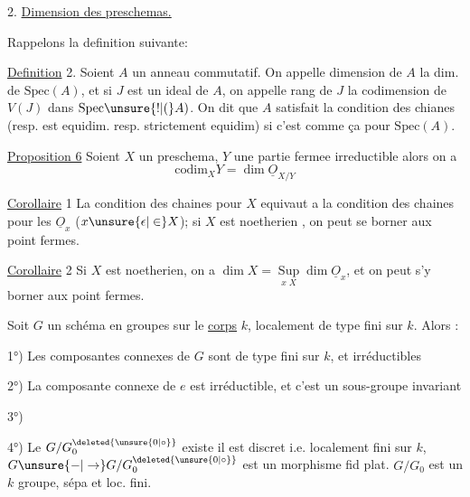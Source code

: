 2. \uline{Dimension des preschemas.}

Rappelons la definition suivante:

\uline{Definition} 2. Soient $A$ un anneau commutatif. On appelle dimension de
$A$ la dim. de $\mathrm{Spec}(A)$, et si $J$ est un ideal de $A$, on appelle rang de $J$
la codimension de $V(J)$ dans $\mathrm{Spec}\unsure{!|(}A)$. On dit que $A$  satisfait
la condition des chianes (resp. est equidim. resp. strictement equidim)
si c'est comme ça pour $\mathrm{Spec}(A)$.

\uline{Proposition 6} \quad Soient $X$ un preschema, $Y$ une partie fermee irreductible
alors on a
\[
\mathrm{codim}_X Y=\dim\underline O_{X/Y}
\]

\uline{Corollaire} 1 \quad La condition des chaines pour $X$ equivaut a la condition
des chaines pour les $\underline O_x$ ($x\unsure{\epsilon|\in}X$); si $X$ est noetherien , on peut se
borner aux point fermes.

\uline{Corollaire} 2 \quad Si $X$ est noetherien, on a $\dim X=\mathop{\mathrm{Sup}}\limits_{x\;X}\dim\underline O_x$, et
on peut s'y borner aux point fermes.


Soit $G$ un schéma en groupes sur le \uline{corps} $k$,
localement de type fini sur $k$. Alors :


1°) Les composantes connexes  de $G$ sont de type
fini sur $k$, et irréductibles

2°) La composante connexe  de $e$ est
 irréductible, et c'est un sous-groupe invariant

3°)  

4°) Le  $G/G^{\deleted{\unsure{0|\circ}}}_0$ existe il est discret i.e.
localement fini sur $k$, $G\unsure{-|\to}G/G^{\deleted{\unsure{0|\circ}}}_0$ est
un morphisme  fid plat. $G/G_0$ est
un $k$ groupe, sépa et loc. fini. 

